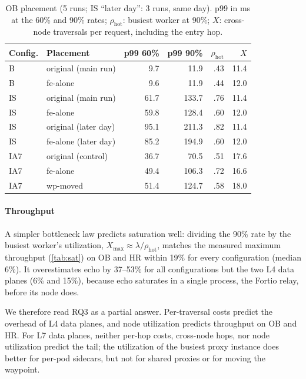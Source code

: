 \begin{table}[t]
  \centering
  \caption{OB placement (5 runs; IS ``later day'': 3 runs, same day). p99 in ms at the 60\% and 90\% rates; $\rho_{\text{hot}}$:
           busiest worker at 90\%; $X$: cross-node traversals per request,
           including the entry hop.}
  \label{tab:placement}
  \footnotesize
  \setlength{\tabcolsep}{3pt}
  \begin{tabular}{@{}llrrrr@{}}
    \toprule
    Config. & Placement & p99 60\% & p99 90\% & $\rho_{\text{hot}}$ & $X$ \\
    \midrule
    B   & original (main run)      & 9.7  & 11.9  & .43 & 11.4 \\
    B   & fe-alone                 & 9.6  & 11.9  & .44 & 12.0 \\
    IS  & original (main run)      & 61.7 & 133.7 & .76 & 11.4 \\
    IS  & fe-alone                 & 59.8 & 128.4 & .60 & 12.0 \\
    IS  & original (later day)     & 95.1 & 211.3 & .82 & 11.4 \\
    IS  & fe-alone (later day)     & 85.2 & 194.9 & .60 & 12.0 \\
    IA7 & original (control)       & 36.7 & 70.5  & .51 & 17.6 \\
    IA7 & fe-alone                 & 49.4 & 106.3 & .72 & 16.6 \\
    IA7 & wp-moved                 & 51.4 & 124.7 & .58 & 18.0 \\
    \bottomrule
  \end{tabular}
\end{table}

\paragraph{Throughput}
A simpler bottleneck law predicts saturation well: dividing the 90\% rate by
the busiest worker's utilization, $X_{\max} \approx \lambda/\rho_{\text{hot}}$,
matches the measured maximum throughput (\cref{tab:sat}) on OB and HR within
19\% for every configuration (median 6\%). It overestimates echo by 37--53\%
for all configurations but the two L4 data planes (6\% and 15\%), because
echo saturates in a single process, the Fortio relay, before its node does.

We therefore read RQ3 as a partial answer. Per-traversal costs predict the
overhead of L4 data planes, and node utilization predicts throughput on OB and HR. For L7
data planes, neither per-hop costs, cross-node hops, nor node utilization
predict the tail; the utilization of the busiest proxy instance does better for
per-pod sidecars, but not for shared proxies or for moving the waypoint.

